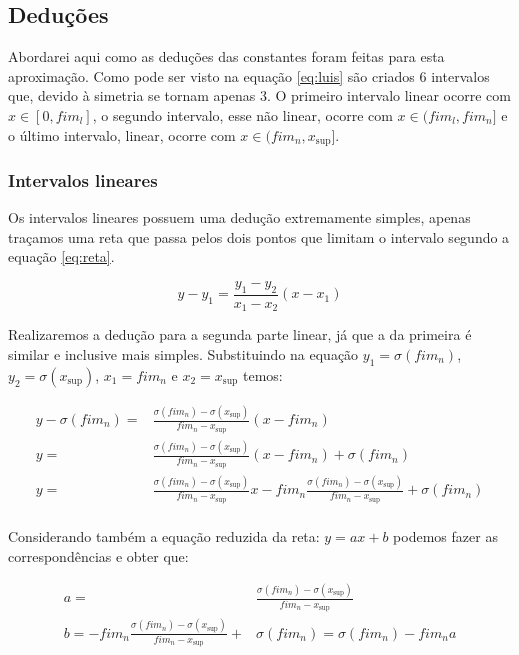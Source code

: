 \documentclass{article}
\begin{document}
\subsection{Deduções}
Abordarei aqui como as deduções das constantes foram feitas para esta aproximação. Como pode ser visto na equação \ref{eq:luis} são criados 6 intervalos que, devido à simetria se tornam apenas 3. O primeiro intervalo linear ocorre com $x \in [0, fim_l]$, o segundo intervalo, esse não linear, ocorre com $x \in (fim_l, fim_n]$ e o último intervalo, linear, ocorre com $x \in (fim_n, x_{\sup}]$.

\subsubsection{Intervalos lineares}
Os intervalos lineares possuem uma dedução extremamente simples, apenas traçamos uma reta que passa pelos dois pontos que limitam o intervalo segundo a equação \ref{eq:reta}.

\begin{equation}
    \label{eq:reta}
   y - y_1= \frac{y_1 - y_2}{x_1 - x_2} (x - x_1)
\end{equation}

Realizaremos a dedução para a segunda parte linear, já que a da primeira é similar e inclusive mais simples. Substituindo na equação $y_1 = \sigma(fim_n)$, $y_2 = \sigma(x_{\sup})$, $x_1 = fim_n$ e $x_2 = x_{\sup}$ temos:

\begin{equation}
\begin{split}
    y - \sigma(fim_n) =& \frac{\sigma(fim_n) - \sigma(x_{\sup})}{fim_n - x_{\sup}}(x - fim_n) \\
    y =& \frac{\sigma(fim_n) - \sigma(x_{\sup})}{fim_n - x_{\sup}}(x - fim_n) + \sigma(fim_n) \\
    y =& \frac{\sigma(fim_n) - \sigma(x_{\sup})}{fim_n - x_{\sup}}x - fim_n \frac{\sigma(fim_n) - \sigma(x_{\sup})}{fim_n - x_{\sup}} + \sigma(fim_n) \\
\end{split}
\end{equation}

Considerando também a equação reduzida da reta: $y = ax + b$ podemos fazer as correspondências e obter que:

\begin{equation}
\begin{split}
    a =& \frac{\sigma(fim_n) - \sigma(x_{\sup})}{fim_n - x_{\sup}} \\
    b = - fim_n \frac{\sigma(fim_n) - \sigma(x_{\sup})}{fim_n - x_{\sup}} +& \sigma(fim_n) = \sigma(fim_n) - fim_n a
\end{split}
\end{equation}
\end{document}

